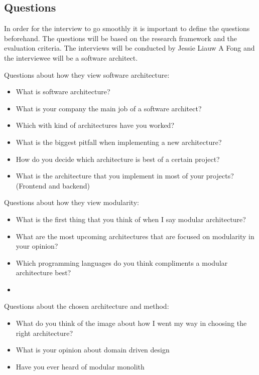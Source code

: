 \subsection{Questions}

In order for the interview to go smoothly it is important to define the questions beforehand. The questions will be based on the research framework and the evaluation criteria. The interviews will be conducted by Jessie Liauw A Fong and the interviewee will be a software architect.

Questions about how they view software architecture:
\begin{itemize}
  \item What is software architecture?
  \item What is your company the main job of a software architect?
  \item Which with kind of architectures have you worked?
  \item What is the biggest pitfall when implementing a new architecture?
  \item How do you decide which architecture is best of a certain project?
  \item What is the architecture that you implement in most of your projects? (Frontend and backend)
\end{itemize}

Questions about how they view modularity:
\begin{itemize}
  \item What is the first thing that you think of when I say modular architecture?
  \item What are the most upcoming architectures that are focused on modularity in your opinion?
  \item Which programming languages do you think compliments a modular architecture best?
  \item
\end{itemize}

Questions about the chosen architecture and method:
\begin{itemize}
  \item What do you think of the image about how I went my way in choosing the right architecture?
  \item What is your opinion about domain driven design
  \item Have you ever heard of modular monolith
\end{itemize}

